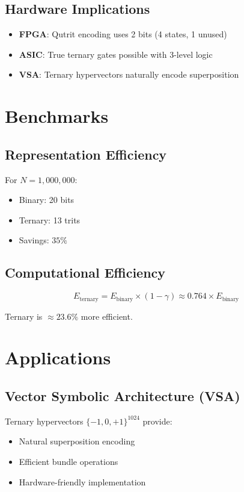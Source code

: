\documentclass[12pt,a4paper]{article}
\begin{document}
\subsection{Hardware Implications}

\begin{itemize}
\item \textbf{FPGA}: Qutrit encoding uses 2 bits (4 states, 1 unused)
\item \textbf{ASIC}: True ternary gates possible with 3-level logic
\item \textbf{VSA}: Ternary hypervectors naturally encode superposition
\end{itemize}

\section{Benchmarks}

\subsection{Representation Efficiency}

For $N = 1,000,000$:
\begin{itemize}
\item Binary: 20 bits
\item Ternary: 13 trits
\item Savings: $35\%$
\end{itemize}

\subsection{Computational Efficiency}

\begin{equation}
E_{\text{ternary}} = E_{\text{binary}} \times (1 - \gamma) \approx 0.764 \times E_{\text{binary}}
\end{equation}

Ternary is $\approx 23.6\%$ more efficient.

\section{Applications}

\subsection{Vector Symbolic Architecture (VSA)}

Ternary hypervectors $\{-1, 0, +1\}^{1024}$ provide:
\begin{itemize}
\item Natural superposition encoding
\item Efficient bundle operations
\item Hardware-friendly implementation
\end{itemize}
\end{document}
